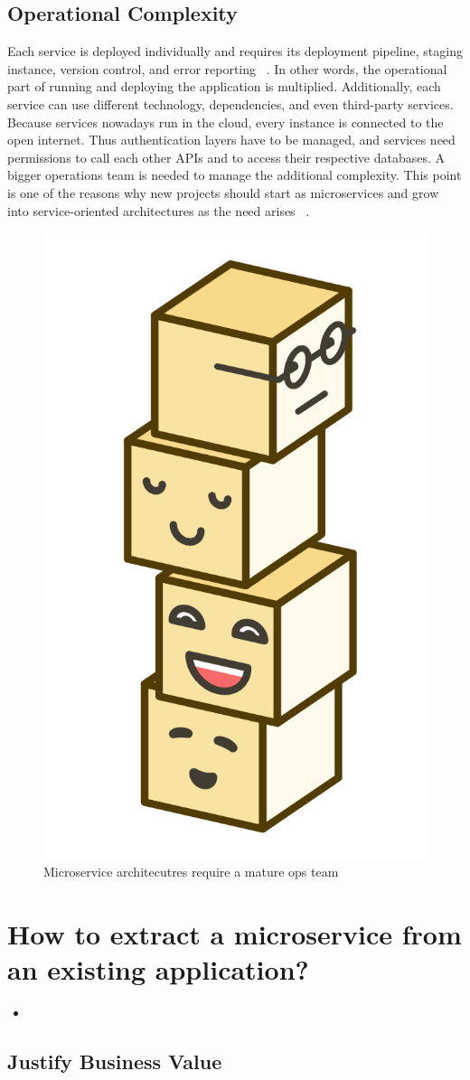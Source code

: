 \subsection{Operational Complexity}
\label{sec:theory:challenges:ops}

Each service is deployed individually and requires its deployment pipeline, staging instance, version control, and error reporting ~\cite{fachat.2019.1}. In other words, the operational part of running and deploying the application is multiplied. Additionally, each service can use different technology, dependencies, and even third-party services. Because services nowadays run in the cloud, every instance is connected to the open internet. Thus authentication layers have to be managed, and services need permissions to call each other APIs and to access their respective databases. A bigger operations team is needed to manage the additional complexity. This point is one of the reasons why new projects should start as microservices and grow into service-oriented architectures as the need arises ~\cite{krivtsov.2019}.

\begin{figure}[ht]
  \centering
  \includegraphics[width=0.25\linewidth]{assets/illustration-microservice-stack.png}
  \caption{Microservice architecutres require a mature ops team}
\end{figure}


\section{How to extract a microservice from an existing application?}

\begin{itemize}
  \item {}
\end{itemize}


\subsection{Justify Business Value}

